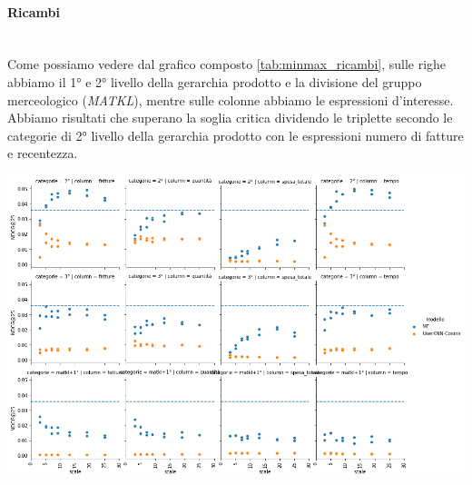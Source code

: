 \paragraph{Ricambi}\mbox{} \\
Come possiamo vedere dal grafico composto \ref{tab:minmax_ricambi}, sulle righe abbiamo il 1° e 2° livello della gerarchia prodotto e la divisione del gruppo merceologico (\textit{MATKL}), mentre sulle colonne abbiamo le espressioni d'interesse. Abbiamo risultati che superano la soglia critica dividendo le triplette secondo le categorie di 2° livello della gerarchia prodotto con le espressioni numero di fatture e recentezza.
\begin{center}
\includegraphics[width=16cm]{figures/risultati_minmax_categoria_ricambi.png}
\label{tab:minmax_ricambi}
\end{center}


